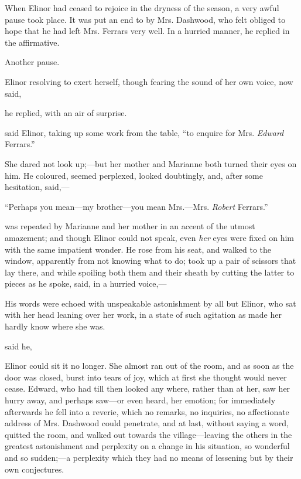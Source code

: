When Elinor had ceased to rejoice in the dryness of the season, a very awful pause took place. It was put an end to by Mrs. Dashwood, who felt obliged to hope that he had left Mrs. Ferrars very well. In a hurried manner, he replied in the affirmative.

Another pause.

Elinor resolving to exert herself, though fearing the sound of her own voice, now said,


 he replied, with an air of surprise. 

 said Elinor, taking up some work from the table, “to enquire for Mrs. {\em Edward} Ferrars.”

She dared not look up;---but her mother and Marianne both turned their eyes on him. He coloured, seemed perplexed, looked doubtingly, and, after some hesitation, said,---

“Perhaps you mean---my brother---you mean Mrs.---Mrs. {\em Robert} Ferrars.”

 was repeated by Marianne and her mother in an accent of the utmost amazement; and though Elinor could not speak, even {\em her} eyes were fixed on him with the same impatient wonder. He rose from his seat, and walked to the window, apparently from not knowing what to do; took up a pair of scissors that lay there, and while spoiling both them and their sheath by cutting the latter to pieces as he spoke, said, in a hurried voice,---


His words were echoed with unspeakable astonishment by all but Elinor, who sat with her head leaning over her work, in a state of such agitation as made her hardly know where she was.

 said he, 

Elinor could sit it no longer. She almost ran out of the room, and as soon as the door was closed, burst into tears of joy, which at first she thought would never cease. Edward, who had till then looked any where, rather than at her, saw her hurry away, and perhaps saw---or even heard, her emotion; for immediately afterwards he fell into a reverie, which no remarks, no inquiries, no affectionate address of Mrs. Dashwood could penetrate, and at last, without saying a word, quitted the room, and walked out towards the village---leaving the others in the greatest astonishment and perplexity on a change in his situation, so wonderful and so sudden;---a perplexity which they had no means of lessening but by their own conjectures.

